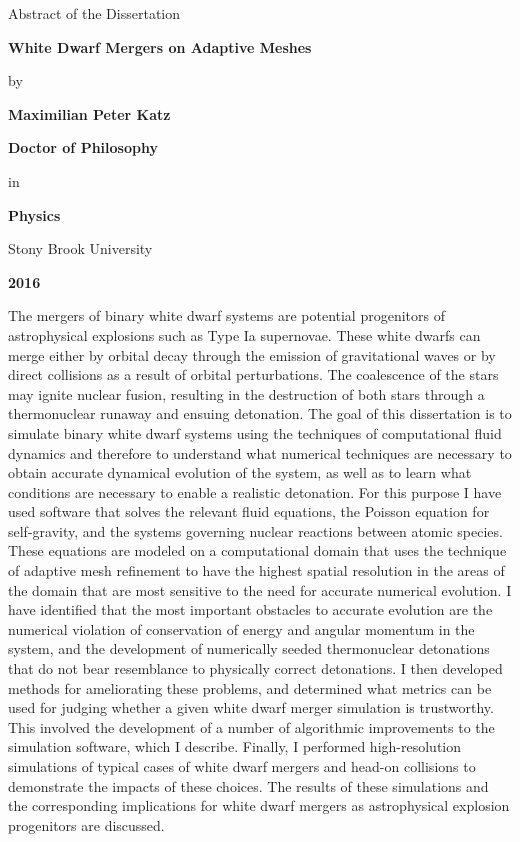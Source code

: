 \documentclass[12pt]{article}
\begin{document}
\newpage

\centerline{Abstract of the Dissertation}
\vspace*{1\baselineskip}
\centerline{\bf{White Dwarf Mergers on Adaptive Meshes}}
\vspace*{1\baselineskip}
\centerline{by}
\vspace*{1\baselineskip}
\centerline{\bf{Maximilian Peter Katz}}
\vspace*{1\baselineskip}
\centerline{\bf{Doctor of Philosophy}}
\vspace*{1\baselineskip}
\centerline{in}
\vspace*{1\baselineskip}
\centerline{\bf{Physics}}
\vspace*{1\baselineskip}
\centerline{Stony Brook University}
\vspace*{1\baselineskip}
\centerline{\bf{2016}}
\vspace*{2\baselineskip}
The mergers of binary white dwarf systems are potential progenitors of astrophysical
explosions such as Type Ia supernovae. These white dwarfs can merge either by orbital
decay through the emission of gravitational waves or by direct collisions as a result of
orbital perturbations. The coalescence of the stars may ignite nuclear fusion, resulting in
the destruction of both stars through a thermonuclear runaway and ensuing detonation.
The goal of this dissertation is to simulate binary white dwarf systems using the
techniques of computational fluid dynamics and therefore to understand what numerical
techniques are necessary to obtain accurate dynamical evolution of the system, as well as
to learn what conditions are necessary to enable a realistic detonation. For this purpose I
have used software that solves the relevant fluid equations, the Poisson equation for self-gravity,
and the systems governing nuclear reactions between atomic species. These
equations are modeled on a computational domain that uses the technique of adaptive
mesh refinement to have the highest spatial resolution in the areas of the domain that are
most sensitive to the need for accurate numerical evolution. I have identified that the
most important obstacles to accurate evolution are the numerical violation of
conservation of energy and angular momentum in the system, and the development of
numerically seeded thermonuclear detonations that do not bear resemblance to physically
correct detonations. I then developed methods for ameliorating these problems, and
determined what metrics can be used for judging whether a given white dwarf merger
simulation is trustworthy. This involved the development of a number of algorithmic
improvements to the simulation software, which I describe. Finally, I performed high-resolution
simulations of typical cases of white dwarf mergers and head-on collisions to
demonstrate the impacts of these choices. The results of these simulations and the
corresponding implications for white dwarf mergers as astrophysical explosion
progenitors are discussed.
\end{document}
